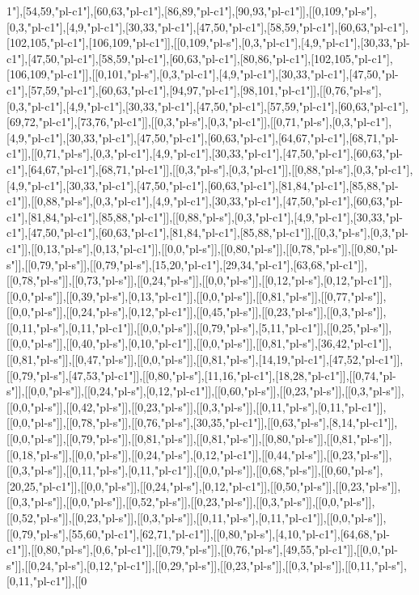 1"],[54,59,"pl-c1"],[60,63,"pl-c1"],[86,89,"pl-c1"],[90,93,"pl-c1"]],[[0,109,"pl-s"],[0,3,"pl-c1"],[4,9,"pl-c1"],[30,33,"pl-c1"],[47,50,"pl-c1"],[58,59,"pl-c1"],[60,63,"pl-c1"],[102,105,"pl-c1"],[106,109,"pl-c1"]],[[0,109,"pl-s"],[0,3,"pl-c1"],[4,9,"pl-c1"],[30,33,"pl-c1"],[47,50,"pl-c1"],[58,59,"pl-c1"],[60,63,"pl-c1"],[80,86,"pl-c1"],[102,105,"pl-c1"],[106,109,"pl-c1"]],[[0,101,"pl-s"],[0,3,"pl-c1"],[4,9,"pl-c1"],[30,33,"pl-c1"],[47,50,"pl-c1"],[57,59,"pl-c1"],[60,63,"pl-c1"],[94,97,"pl-c1"],[98,101,"pl-c1"]],[[0,76,"pl-s"],[0,3,"pl-c1"],[4,9,"pl-c1"],[30,33,"pl-c1"],[47,50,"pl-c1"],[57,59,"pl-c1"],[60,63,"pl-c1"],[69,72,"pl-c1"],[73,76,"pl-c1"]],[[0,3,"pl-s"],[0,3,"pl-c1"]],[[0,71,"pl-s"],[0,3,"pl-c1"],[4,9,"pl-c1"],[30,33,"pl-c1"],[47,50,"pl-c1"],[60,63,"pl-c1"],[64,67,"pl-c1"],[68,71,"pl-c1"]],[[0,71,"pl-s"],[0,3,"pl-c1"],[4,9,"pl-c1"],[30,33,"pl-c1"],[47,50,"pl-c1"],[60,63,"pl-c1"],[64,67,"pl-c1"],[68,71,"pl-c1"]],[[0,3,"pl-s"],[0,3,"pl-c1"]],[[0,88,"pl-s"],[0,3,"pl-c1"],[4,9,"pl-c1"],[30,33,"pl-c1"],[47,50,"pl-c1"],[60,63,"pl-c1"],[81,84,"pl-c1"],[85,88,"pl-c1"]],[[0,88,"pl-s"],[0,3,"pl-c1"],[4,9,"pl-c1"],[30,33,"pl-c1"],[47,50,"pl-c1"],[60,63,"pl-c1"],[81,84,"pl-c1"],[85,88,"pl-c1"]],[[0,88,"pl-s"],[0,3,"pl-c1"],[4,9,"pl-c1"],[30,33,"pl-c1"],[47,50,"pl-c1"],[60,63,"pl-c1"],[81,84,"pl-c1"],[85,88,"pl-c1"]],[[0,3,"pl-s"],[0,3,"pl-c1"]],[[0,13,"pl-s"],[0,13,"pl-c1"]],[[0,0,"pl-s"]],[[0,80,"pl-s"]],[[0,78,"pl-s"]],[[0,80,"pl-s"]],[[0,79,"pl-s"]],[[0,79,"pl-s"],[15,20,"pl-c1"],[29,34,"pl-c1"],[63,68,"pl-c1"]],[[0,78,"pl-s"]],[[0,73,"pl-s"]],[[0,24,"pl-s"]],[[0,0,"pl-s"]],[[0,12,"pl-s"],[0,12,"pl-c1"]],[[0,0,"pl-s"]],[[0,39,"pl-s"],[0,13,"pl-c1"]],[[0,0,"pl-s"]],[[0,81,"pl-s"]],[[0,77,"pl-s"]],[[0,0,"pl-s"]],[[0,24,"pl-s"],[0,12,"pl-c1"]],[[0,45,"pl-s"]],[[0,23,"pl-s"]],[[0,3,"pl-s"]],[[0,11,"pl-s"],[0,11,"pl-c1"]],[[0,0,"pl-s"]],[[0,79,"pl-s"],[5,11,"pl-c1"]],[[0,25,"pl-s"]],[[0,0,"pl-s"]],[[0,40,"pl-s"],[0,10,"pl-c1"]],[[0,0,"pl-s"]],[[0,81,"pl-s"],[36,42,"pl-c1"]],[[0,81,"pl-s"]],[[0,47,"pl-s"]],[[0,0,"pl-s"]],[[0,81,"pl-s"],[14,19,"pl-c1"],[47,52,"pl-c1"]],[[0,79,"pl-s"],[47,53,"pl-c1"]],[[0,80,"pl-s"],[11,16,"pl-c1"],[18,28,"pl-c1"]],[[0,74,"pl-s"]],[[0,0,"pl-s"]],[[0,24,"pl-s"],[0,12,"pl-c1"]],[[0,60,"pl-s"]],[[0,23,"pl-s"]],[[0,3,"pl-s"]],[[0,0,"pl-s"]],[[0,42,"pl-s"]],[[0,23,"pl-s"]],[[0,3,"pl-s"]],[[0,11,"pl-s"],[0,11,"pl-c1"]],[[0,0,"pl-s"]],[[0,78,"pl-s"]],[[0,76,"pl-s"],[30,35,"pl-c1"]],[[0,63,"pl-s"],[8,14,"pl-c1"]],[[0,0,"pl-s"]],[[0,79,"pl-s"]],[[0,81,"pl-s"]],[[0,81,"pl-s"]],[[0,80,"pl-s"]],[[0,81,"pl-s"]],[[0,18,"pl-s"]],[[0,0,"pl-s"]],[[0,24,"pl-s"],[0,12,"pl-c1"]],[[0,44,"pl-s"]],[[0,23,"pl-s"]],[[0,3,"pl-s"]],[[0,11,"pl-s"],[0,11,"pl-c1"]],[[0,0,"pl-s"]],[[0,68,"pl-s"]],[[0,60,"pl-s"],[20,25,"pl-c1"]],[[0,0,"pl-s"]],[[0,24,"pl-s"],[0,12,"pl-c1"]],[[0,50,"pl-s"]],[[0,23,"pl-s"]],[[0,3,"pl-s"]],[[0,0,"pl-s"]],[[0,52,"pl-s"]],[[0,23,"pl-s"]],[[0,3,"pl-s"]],[[0,0,"pl-s"]],[[0,52,"pl-s"]],[[0,23,"pl-s"]],[[0,3,"pl-s"]],[[0,11,"pl-s"],[0,11,"pl-c1"]],[[0,0,"pl-s"]],[[0,79,"pl-s"],[55,60,"pl-c1"],[62,71,"pl-c1"]],[[0,80,"pl-s"],[4,10,"pl-c1"],[64,68,"pl-c1"]],[[0,80,"pl-s"],[0,6,"pl-c1"]],[[0,79,"pl-s"]],[[0,76,"pl-s"],[49,55,"pl-c1"]],[[0,0,"pl-s"]],[[0,24,"pl-s"],[0,12,"pl-c1"]],[[0,29,"pl-s"]],[[0,23,"pl-s"]],[[0,3,"pl-s"]],[[0,11,"pl-s"],[0,11,"pl-c1"]],[[0